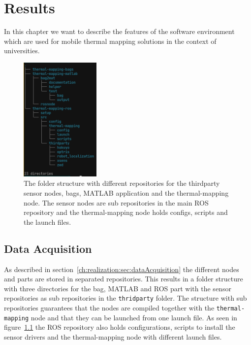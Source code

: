 \chapter{Results}\label{ch:results}

In this chapter we want to describe the features of the software environment which are used for mobile thermal mapping solutions in the context of universities.

\begin{figure}
    \centering
    \includegraphics[width=0.35\textwidth]{img/results/folder_structure.png}
    \caption{The folder structure with different repositories for the thirdparty sensor nodes, bags, MATLAB application and the thermal-mapping node. The sensor nodes are sub repositories in the main ROS repository and the thermal-mapping node holds configs, scripts and the launch files.}
    \label{fig:folder_structure}
\end{figure}

\section{Data Acquisition}\label{ch:results:sec:dataAcquisition}

As described in section~\ref{ch:realization:sec:dataAcquisition} the different nodes and parts are stored in separated repositories.
This results in a folder structure with three directories for the bag, MATLAB and ROS part with the sensor repositories as sub repositories in the \texttt{thridparty} folder.
The structure with sub repositories guarantees that the nodes are compiled together with the \texttt{thermal-mapping} node and that they can be launched from one launch file.
As seen in figure~\ref{fig:folder_structure} the ROS repository also holds configurations, scripts to install the sensor drivers and the thermal-mapping node with different launch files.


